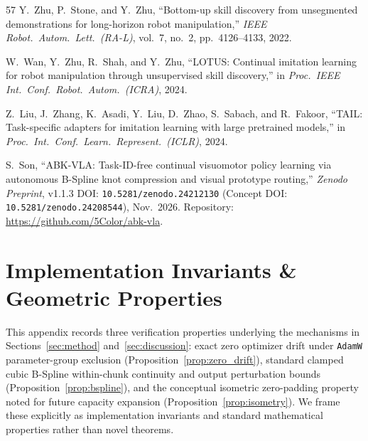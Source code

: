 \documentclass[10pt]{article}
\begin{document}
\begin{thebibliography}{57}
Y.~Zhu, P.~Stone, and Y.~Zhu, ``Bottom-up skill discovery from unsegmented demonstrations for long-horizon robot manipulation,'' \emph{IEEE Robot.\ Autom.\ Lett.\ (RA-L)}, vol.~7, no.~2, pp.~4126--4133, 2022.

W.~Wan, Y.~Zhu, R.~Shah, and Y.~Zhu, ``LOTUS: Continual imitation learning for robot manipulation through unsupervised skill discovery,'' in \emph{Proc.\ IEEE Int.\ Conf.\ Robot.\ Autom.\ (ICRA)}, 2024.

Z.~Liu, J.~Zhang, K.~Asadi, Y.~Liu, D.~Zhao, S.~Sabach, and R.~Fakoor, ``TAIL: Task-specific adapters for imitation learning with large pretrained models,'' in \emph{Proc.\ Int.\ Conf.\ Learn.\ Represent.\ (ICLR)}, 2024.

S.~Son, ``ABK-VLA: Task-ID-free continual visuomotor policy learning via autonomous B-Spline knot compression and visual prototype routing,'' \emph{Zenodo Preprint}, v1.1.3 DOI: \texttt{10.5281/zenodo.24212130} (Concept DOI: \texttt{10.5281/zenodo.24208544}), Nov.\ 2026. Repository: \url{https://github.com/5Color/abk-vla}.

\end{thebibliography}


\clearpage
\appendix

\section{Implementation Invariants \& Geometric Properties}
\label{app:proofs}

This appendix records three verification properties underlying the mechanisms in Sections~\ref{sec:method} and~\ref{sec:discussion}: exact zero optimizer drift under \texttt{AdamW} parameter-group exclusion (Proposition~\ref{prop:zero_drift}), standard clamped cubic B-Spline within-chunk continuity and output perturbation bounds (Proposition~\ref{prop:bspline}), and the conceptual isometric zero-padding property noted for future capacity expansion (Proposition~\ref{prop:isometry}). We frame these explicitly as implementation invariants and standard mathematical properties rather than novel theorems.
\end{document}
